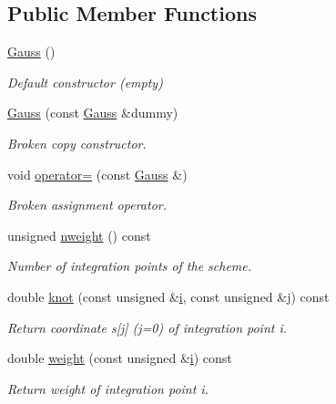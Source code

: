 \subsection*{Public Member Functions}
\begin{DoxyCompactItemize}
\item 
\hyperlink{classoomph_1_1Gauss_3_011_00_012_01_4_a3600224d34344632f5207822eb5d4c34}{Gauss} ()
\begin{DoxyCompactList}\small\item\em Default constructor (empty) \end{DoxyCompactList}\item 
\hyperlink{classoomph_1_1Gauss_3_011_00_012_01_4_a0be4d48ab2c6a6667e922780aafb0960}{Gauss} (const \hyperlink{classoomph_1_1Gauss}{Gauss} \&dummy)
\begin{DoxyCompactList}\small\item\em Broken copy constructor. \end{DoxyCompactList}\item 
void \hyperlink{classoomph_1_1Gauss_3_011_00_012_01_4_adabe823a74391845444b462a00c55c60}{operator=} (const \hyperlink{classoomph_1_1Gauss}{Gauss} \&)
\begin{DoxyCompactList}\small\item\em Broken assignment operator. \end{DoxyCompactList}\item 
unsigned \hyperlink{classoomph_1_1Gauss_3_011_00_012_01_4_ace866a6cae8c2180b97b2eea315975df}{nweight} () const
\begin{DoxyCompactList}\small\item\em Number of integration points of the scheme. \end{DoxyCompactList}\item 
double \hyperlink{classoomph_1_1Gauss_3_011_00_012_01_4_ae9c2e2d8ea3f4f17805324b0ad0a380d}{knot} (const unsigned \&\hyperlink{cfortran_8h_adb50e893b86b3e55e751a42eab3cba82}{i}, const unsigned \&j) const
\begin{DoxyCompactList}\small\item\em Return coordinate s\mbox{[}j\mbox{]} (j=0) of integration point i. \end{DoxyCompactList}\item 
double \hyperlink{classoomph_1_1Gauss_3_011_00_012_01_4_af9d4550c69b33df7560d23b98663d1f8}{weight} (const unsigned \&\hyperlink{cfortran_8h_adb50e893b86b3e55e751a42eab3cba82}{i}) const
\begin{DoxyCompactList}\small\item\em Return weight of integration point i. \end{DoxyCompactList}\end{DoxyCompactItemize}
